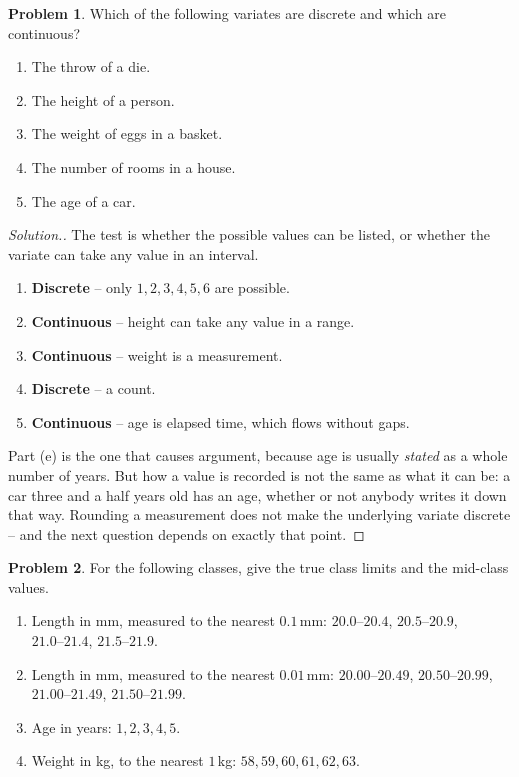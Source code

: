 \documentclass[11pt,a4paper]{article}
\theoremstyle{definition}
\newtheorem{problemx}{Problem}[section]
\newenvironment{problem}{\begin{problemx}}{\end{problemx}}
\newenvironment{solution}
  {\renewcommand{\qedsymbol}{}\begin{proof}[\textit{Solution}.]}
  {\end{proof}}
\begin{document}
\begin{problem}
Which of the following variates are discrete and which are continuous?
\begin{enumerate}
\item[(a).] The throw of a die.
\item[(b).] The height of a person.
\item[(c).] The weight of eggs in a basket.
\item[(d).] The number of rooms in a house.
\item[(e).] The age of a car.
\end{enumerate}
\end{problem}

\begin{solution}
The test is whether the possible values can be listed, or whether the variate can take any
value in an interval.
\begin{enumerate}
\item[(a).] \textbf{Discrete} -- only $1,2,3,4,5,6$ are possible.
\item[(b).] \textbf{Continuous} -- height can take any value in a range.
\item[(c).] \textbf{Continuous} -- weight is a measurement.
\item[(d).] \textbf{Discrete} -- a count.
\item[(e).] \textbf{Continuous} -- age is elapsed time, which flows without gaps.
\end{enumerate}
Part (e) is the one that causes argument, because age is usually \emph{stated} as a whole
number of years. But how a value is recorded is not the same as what it can be: a car
three and a half years old has an age, whether or not anybody writes it down that way.
Rounding a measurement does not make the underlying variate discrete -- and the next
question depends on exactly that point.
\end{solution}

\begin{problem}
For the following classes, give the true class limits and the mid-class values.
\begin{enumerate}
\item[(a).] Length in mm, measured to the nearest $0.1$\,mm:
$20.0\text{--}20.4$, $20.5\text{--}20.9$, $21.0\text{--}21.4$, $21.5\text{--}21.9$.
\item[(b).] Length in mm, measured to the nearest $0.01$\,mm:
$20.00\text{--}20.49$, $20.50\text{--}20.99$, $21.00\text{--}21.49$, $21.50\text{--}21.99$.
\item[(c).] Age in years: $1, 2, 3, 4, 5$.
\item[(d).] Weight in kg, to the nearest $1$\,kg: $58, 59, 60, 61, 62, 63$.
\end{enumerate}
\end{problem}
\end{document}

